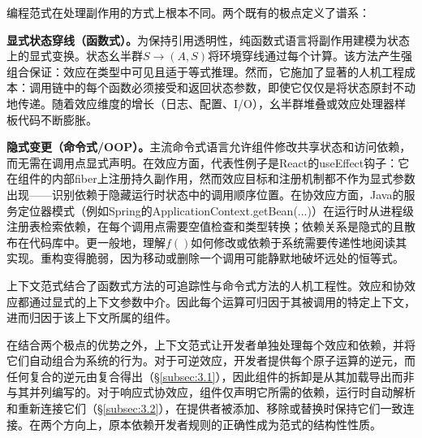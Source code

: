 编程范式在处理副作用的方式上根本不同。两个既有的极点定义了谱系：

\textbf{显式状态穿线（函数式）。}为保持引用透明性，纯函数式语言将副作用建模为状态上的显式变换。状态幺半群$S \to (A, S)$\cite{ref23}将环境穿线通过每个计算。该方法产生强组合保证：效应在类型中可见且适于等式推理。然而，它施加了显著的人机工程成本：调用链中的每个函数必须接受和返回状态参数，即使它仅仅是将状态原封不动地传递。随着效应维度的增长（日志、配置、I/O），幺半群堆叠或效应处理器样板代码不断膨胀。

\textbf{隐式变更（命令式/OOP）。}主流命令式语言允许组件修改共享状态和访问依赖，而无需在调用点显式声明。在效应方面，代表性例子是React的useEffect钩子：它在组件的内部fiber上注册持久副作用，然而效应目标和注册机制都不作为显式参数出现——识别依赖于隐藏运行时状态中的调用顺序位置。在协效应方面，Java的服务定位器模式（例如Spring的ApplicationContext.getBean(...)）在运行时从进程级注册表检索依赖，在每个调用点需要空值检查和类型转换；依赖关系是隐式的且散布在代码库中。更一般地，理解$f()$如何修改或依赖于系统需要传递性地阅读其实现。重构变得脆弱，因为移动或删除一个调用可能静默地破坏远处的恒等式。

上下文范式结合了函数式方法的可追踪性与命令式方法的人机工程性。效应和协效应都通过显式的上下文参数中介。因此每个运算可归因于其被调用的特定上下文，进而归因于该上下文所属的组件。

在结合两个极点的优势之外，上下文范式让开发者单独处理每个效应和依赖，并将它们自动组合为系统的行为。对于可逆效应，开发者提供每个原子运算的逆元，而任何复合的逆元由复合得出（\S\ref{subsec:3.1}），因此组件的拆卸是从其加载导出而非与其并列编写的。对于响应式协效应，组件仅声明它所需的依赖，运行时自动解析和重新连接它们（\S\ref{subsec:3.2}），在提供者被添加、移除或替换时保持它们一致连接。在两个方向上，原本依赖开发者规则的正确性成为范式的结构性性质。
